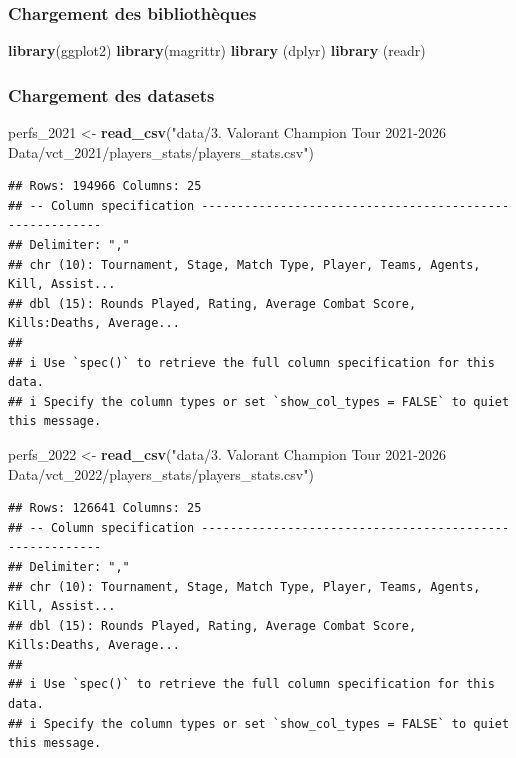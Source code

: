 \documentclass[
]{article}
\newenvironment{Shaded}{\begin{snugshade}}{\end{snugshade}}
\newcommand{\FunctionTok}[1]{\textcolor[rgb]{0.13,0.29,0.53}{\textbf{#1}}}
\newcommand{\NormalTok}[1]{#1}
\newcommand{\OtherTok}[1]{\textcolor[rgb]{0.56,0.35,0.01}{#1}}
\newcommand{\StringTok}[1]{\textcolor[rgb]{0.31,0.60,0.02}{#1}}
\begin{document}
\subsubsection{Chargement des
bibliothèques}\label{chargement-des-bibliothuxe8ques}

\begin{Shaded}
\begin{Highlighting}[]
\FunctionTok{library}\NormalTok{(ggplot2)}
\FunctionTok{library}\NormalTok{(magrittr)}
\FunctionTok{library}\NormalTok{ (dplyr)}
\FunctionTok{library}\NormalTok{ (readr)}
\end{Highlighting}
\end{Shaded}

\subsubsection{Chargement des datasets}\label{chargement-des-datasets}

\begin{Shaded}
\begin{Highlighting}[]
\NormalTok{perfs\_2021 }\OtherTok{\textless{}{-}} \FunctionTok{read\_csv}\NormalTok{(}\StringTok{"data/3. Valorant Champion Tour 2021{-}2026 Data/vct\_2021/players\_stats/players\_stats.csv"}\NormalTok{)}
\end{Highlighting}
\end{Shaded}

\begin{verbatim}
## Rows: 194966 Columns: 25
## -- Column specification --------------------------------------------------------
## Delimiter: ","
## chr (10): Tournament, Stage, Match Type, Player, Teams, Agents, Kill, Assist...
## dbl (15): Rounds Played, Rating, Average Combat Score, Kills:Deaths, Average...
## 
## i Use `spec()` to retrieve the full column specification for this data.
## i Specify the column types or set `show_col_types = FALSE` to quiet this message.
\end{verbatim}

\begin{Shaded}
\begin{Highlighting}[]
\NormalTok{perfs\_2022 }\OtherTok{\textless{}{-}} \FunctionTok{read\_csv}\NormalTok{(}\StringTok{"data/3. Valorant Champion Tour 2021{-}2026 Data/vct\_2022/players\_stats/players\_stats.csv"}\NormalTok{)}
\end{Highlighting}
\end{Shaded}

\begin{verbatim}
## Rows: 126641 Columns: 25
## -- Column specification --------------------------------------------------------
## Delimiter: ","
## chr (10): Tournament, Stage, Match Type, Player, Teams, Agents, Kill, Assist...
## dbl (15): Rounds Played, Rating, Average Combat Score, Kills:Deaths, Average...
## 
## i Use `spec()` to retrieve the full column specification for this data.
## i Specify the column types or set `show_col_types = FALSE` to quiet this message.
\end{verbatim}
\end{document}
